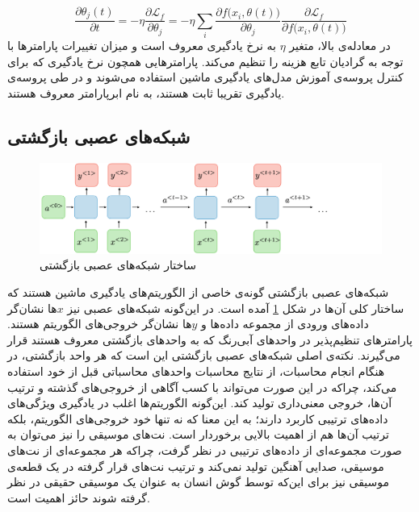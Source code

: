 \begin{equation}
    \frac{\partial \theta_j(t)}{\partial t} = - \eta \frac{\partial \mathcal{L}_f}{\partial \theta_j}
    = - \eta \sum_i \frac{\partial f \big(x_i, \theta (t)\big)}{\partial \theta_j} \frac{\partial \mathcal{L}_f}{\partial f \big(x_i, \theta(t)\big)}
\end{equation}
در معادله‌ی بالا، متغیر
$\eta$
به نرخ یادگیری معروف است و میزان تغییرات پارامترها با توجه به گرادیان تابع هزینه را تنظیم می‌کند.
پارامترهایی همچون نرخ یادگیری که برای کنترل پروسه‌ی آموزش مدل‌های یادگیری ماشین استفاده می‌شوند و در طی پروسه‌ی یادگیری تقریبا ثابت هستند، به نام ابرپارامتر معروف هستند.


\subsection{
شبکه‌های عصبی بازگشتی
}

\begin{figure}
	\centering
	\includegraphics[scale=0.35]{figures/architecture-rnn.png}
	\caption [
	ساختار شبکه‌های عصبی بازگشتی
	]{
	ساختار شبکه‌های عصبی بازگشتی 
	\cite{rnncheat}
	}
	\label{fig:rnnarch}
\end{figure}

شبکه‌های عصبی بازگشتی گونه‌ی خاصی از الگوریتم‌های یادگیری ماشین هستند که ساختار کلی آن‌ها در شکل \ref{fig:rnnarch} آمده است.
در این‌گونه شبکه‌های عصبی نیز
$x$ها نشان‌گر داده‌های ورودی از مجموعه داده‌ها و
$y$ها نشان‌گر خروجی‌های الگوریتم هستند.
پارامترهای تنظیم‌پذیر در واحد‌های آبی‌رنگ که به 
واحد‌های بازگشتی معروف هستند قرار می‌گیرند.
نکته‌ی اصلی شبکه‌های عصبی بازگشتی این است که هر واحد بازگشتی، در هنگام انجام محاسبات، از نتایج محاسبات واحد‌های محاسباتی قبل از خود استفاده می‌کند، چراکه در این صورت می‌تواند با کسب آگاهی از خروجی‌های گذشته و ترتیب آن‌ها، خروجی معنی‌داری تولید کند.
این‌گونه الگوریتم‌ها اغلب در یادگیری ویژگی‌های داده‌های ترتیبی کاربرد دارند؛ به این معنا که نه تنها خود خروجی‌های الگوریتم، بلکه ترتیب آن‌ها هم از اهمیت بالایی برخوردار است.
نت‌های موسیقی را نیز می‌توان به صورت مجموعه‌ای از داده‌های ترتیبی در نظر گرفت، چراکه هر مجموعه‌ای از نت‌های موسیقی، صدایی آهنگین تولید نمی‌کند و ترتیب نت‌های قرار گرفته در یک قطعه‌ی موسیقی نیز برای این‌که توسط گوش انسان به عنوان یک موسیقی حقیقی در نظر گرفته شوند حائز اهمیت است.


